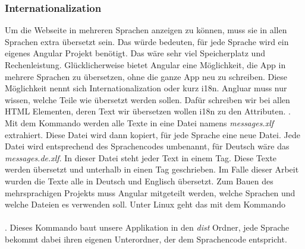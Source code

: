 \subsubsection{Internationalization}
\label{sec:ums-client-i18n}
Um die Webseite in mehreren Sprachen anzeigen zu können, muss sie in allen Sprachen extra übersetzt sein. Das würde bedeuten, für jede Sprache wird ein eigenes Angular Projekt benötigt. Das wäre sehr viel Speicherplatz und Rechenleistung. Glücklicherweise bietet Angular eine Möglichkeit, die App in mehrere Sprachen zu übersetzen, ohne die ganze App neu zu schreiben. Diese Möglichkeit nennt sich Internationalization oder kurz i18n. Angluar muss nur wissen, welche Teile wie übersetzt werden sollen. Dafür schreiben wir bei allen \ac{HTML} Elementen, deren Text wir übersetzen wollen i18n zu den Attributen. . Mit dem Kommando  werden alle Texte in eine Datei namens \textit{messages.xlf} extrahiert. Diese Datei wird dann kopiert, für jede Sprache eine neue Datei. Jede Datei wird entsprechend des Sprachencodes umbenannt, für Deutsch wäre das \textit{messages.de.xlf}. In dieser Datei steht jeder Text in einem  Tag. Diese Texte werden übersetzt und unterhalb in einen  Tag geschrieben. Im Falle dieser Arbeit wurden die Texte alle in Deutsch und Englisch übersetzt. Zum Bauen des mehrsprachigen Projekts muss Angular mitgeteilt werden, welche Sprachen und welche Dateien es verwenden soll. Unter Linux geht das mit dem Kommando \\\\. Dieses Kommando baut unsere Applikation in den \textit{dist} Ordner, jede Sprache bekommt dabei ihren eigenen Unterordner, der dem Sprachencode entspricht.

